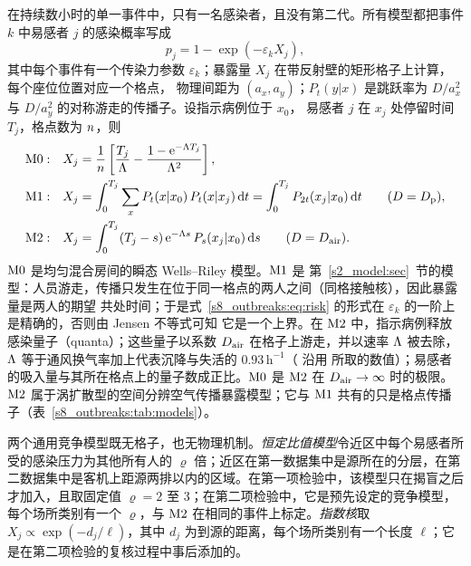 在持续数小时的单一事件中，只有一名感染者，且没有第二代。所有模型都把事件 $k$ 中易感者 $j$ 的感染概率写成
\begin{equation}\label{s8_outbreaks:eq:risk}
  p_j = 1-\exp(-\varepsilon_k X_j),
\end{equation}
其中每个事件有一个传染力参数 $\varepsilon_k$；暴露量 $X_j$ 在带反射壁的矩形格子上计算，每个座位位置对应一个格点，
物理间距为 $(a_x,a_y)$；$P_t(y|x)$ 是跳跃率为 $D/a_x^2$ 与 $D/a_y^2$ 的对称游走的传播子。设指示病例位于 $x_0$，
易感者 $j$ 在 $x_j$ 处停留时间 $T_j$，格点数为 $n$，则
\begin{align}
  \mathrm{M0}:&\quad X_j=\frac{1}{n}\left[\frac{T_j}{\Lambda}-\frac{1-\mathrm{e}^{-\Lambda T_j}}{\Lambda^{2}}\right],
     \label{s8_outbreaks:eq:m0}\\
  \mathrm{M1}:&\quad X_j=\int_0^{T_j}\sum_{x}P_t(x|x_0)\,P_t(x|x_j)\,\mathrm{d} t=\int_0^{T_j}P_{2t}(x_j|x_0)\,\mathrm{d} t
     \qquad(D=D_{\mathrm{p}}),\label{s8_outbreaks:eq:m1}\\
  \mathrm{M2}:&\quad X_j=\int_0^{T_j}(T_j-s)\,\mathrm{e}^{-\Lambda s}\,P_s(x_j|x_0)\,\mathrm{d} s\qquad(D=D_{\mathrm{air}}).
     \label{s8_outbreaks:eq:m2}
\end{align}
$\mathrm{M0}$ 是均匀混合房间的瞬态 Wells--Riley 模型\citep{wells1955airborne,riley1978,gammaitoni1997using}。$\mathrm{M1}$ 是
第~\ref{s2_model:sec}~节的模型：人员游走，传播只发生在位于同一格点的两人之间（同格接触核），因此暴露量是两人的期望
共处时间；于是式~\eqref{s8_outbreaks:eq:risk} 的形式在 $\varepsilon_k$ 的一阶上是精确的，否则由 Jensen 不等式可知
它是一个上界。在 $\mathrm{M2}$ 中，指示病例释放感染量子（quanta）；这些量子以系数 $D_{\mathrm{air}}$ 在格子上游走，并以速率 $\Lambda$
被去除，$\Lambda$ 等于通风换气率加上代表沉降与失活的 $0.93\,\mathrm{h}^{-1}$（\citet{ou2022} 沿用 \citet{miller2021}
所取的数值）；易感者的吸入量与其所在格点上的量子数成正比。$\mathrm{M0}$ 是 $\mathrm{M2}$ 在 $D_{\mathrm{air}}\to\infty$ 时的极限。$\mathrm{M2}$
属于涡扩散型的空间分辨空气传播暴露模型\citep{cheng2011modeling,venkatram2021modeling,lau2022predicting}；它与 $\mathrm{M1}$
共有的只是格点传播子（表~\ref{s8_outbreaks:tab:models}）。

两个通用竞争模型既无格子，也无物理机制。\emph{恒定比值模型}令近区中每个易感者所受的感染压力为其他所有人的 $\varrho$
倍；近区在第一数据集中是源所在的分层，在第二数据集中是客机上距源两排以内的区域。在第一项检验中，该模型只在揭盲之后
才加入，且取固定值 $\varrho=2$ 至 3；在第二项检验中，它是预先设定的竞争模型，每个场所类别有一个 $\varrho$，与 $\mathrm{M2}$
在相同的事件上标定。\emph{指数核}取 $X_j\propto\exp(-d_j/\ell)$，其中 $d_j$ 为到源的距离，每个场所类别有一个长度
$\ell$；它是在第二项检验的复核过程中事后添加的。

